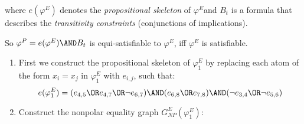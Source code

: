 \documentclass[11pt,a4paper]{uebung}
\begin{document}
{where $e(\varphi ^{E})$ denotes the \textit{propositional skeleton} of $%
\varphi ^{E}$and $B_{t}$ is a formula that describes the \textit{%
transitivity constraints} (conjunctions of implications).

So $\varphi ^{P}=e(\varphi ^{E})\AND B_{t}$ is equi-satisfiable to $\varphi
^{E}$, iff $\varphi ^{E}$ is satisfiable.

\begin{enumerate}
\item First we construct the propositional skeleton of $\varphi _{1}^{E}$ by
replacing each atom of the form $x_{i}=x_{j}$ in $\varphi _{1}^{E}$ with $%
e_{i,j}$, such that:%
\begin{equation*}
e(\varphi _{1}^{E})=(e_{4,5}\OR e_{4,7}\OR\lnot e_{6,7})\AND(e_{6,8}\OR %
e_{7,8})\AND(\lnot e_{3,4}\OR\lnot e_{5,6})
\end{equation*}

\item Construct the nonpolar equality graph $G_{NP}^{E}(\varphi _{1}^{E})$:


\end{enumerate}}
\end{document}
